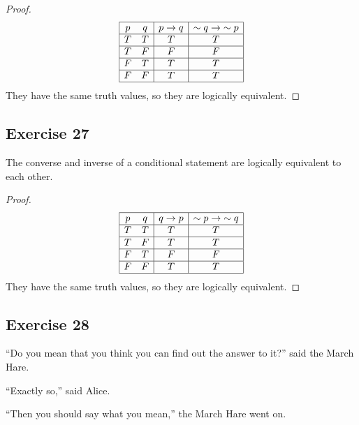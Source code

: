 \documentclass[14pt]{extarticle}
\begin{document}
\begin{proof}
    $$
        \begin{array}{|cc|c|c|}
            \hline
            p & q & p \to q & {\sim q} \to{\sim p} \\
            \hline
            T & T & T       & T                    \\
            \hline
            T & F & F       & F                    \\
            \hline
            F & T & T       & T                    \\
            \hline
            F & F & T       & T                    \\
            \hline
        \end{array}
    $$
    They have the same truth values, so they are logically equivalent.
\end{proof}

\subsection{Exercise 27}
The converse and inverse of a conditional statement are logically equivalent to each other.

\begin{proof}
    $$
        \begin{array}{|cc|c|c|}
            \hline
            p & q & q \to p & {\sim p} \to {\sim q} \\
            \hline
            T & T & T       & T                     \\
            \hline
            T & F & T       & T                     \\
            \hline
            F & T & F       & F                     \\
            \hline
            F & F & T       & T                     \\
            \hline
        \end{array}
    $$
    They have the same truth values, so they are logically equivalent.
\end{proof}

\subsection{Exercise 28}
“Do you mean that you think you can find out the answer to it?” said the March Hare.

“Exactly so,” said Alice.

“Then you should say what you mean,” the March Hare went on.
\end{document}
